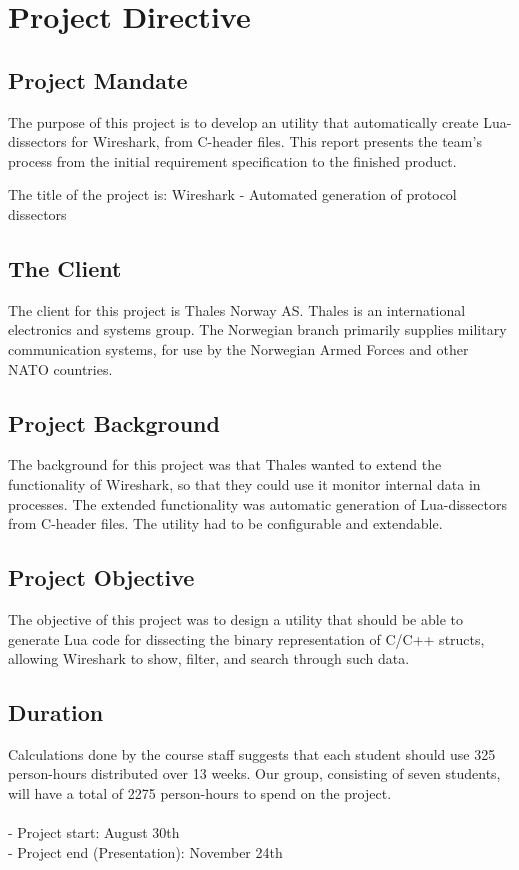 \chapter{Project Directive}


\section{Project Mandate}
The purpose of this project is to develop an utility that automatically create Lua-dissectors for Wireshark, from C-header files. This report presents the team’s process from the initial requirement specification to the finished product. 

The title of the project is: Wireshark - Automated generation of protocol dissectors

\section{The Client}
The client for this project is Thales Norway AS. Thales is an international electronics and systems group. The Norwegian branch primarily supplies military communication systems, for use by the Norwegian Armed Forces and other NATO countries.

\section{Project Background}
The background for this project was that Thales wanted to extend the functionality of Wireshark, so that they could use it monitor internal data in processes. The extended functionality was automatic generation of Lua-dissectors from C-header files. The utility had to be configurable and extendable.

\section{Project Objective}
 The objective of this project was to design a utility that should be able to generate Lua code for dissecting the binary representation of C/C++ structs, allowing Wireshark to show, filter, and search through such data.

\section{Duration}
Calculations done by the course staff suggests that each student should use 325 person-hours distributed over 13 weeks. Our group, consisting of seven students, will have a total of 2275 person-hours to spend on the project.\\
\\- Project start: August 30th
\\- Project end (Presentation): November 24th


